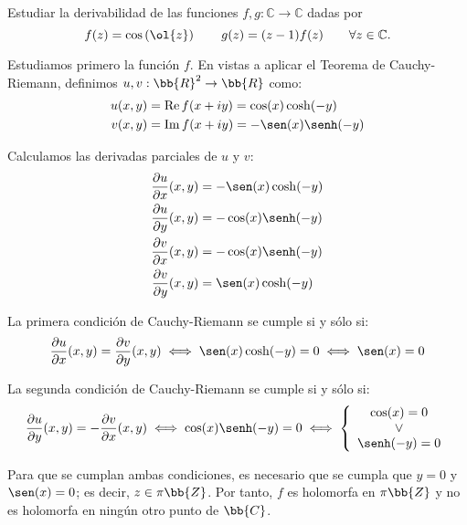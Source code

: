 \documentclass[12pt]{article}
\renewcommand{\Re}{\operatorname{Re}} %
\renewcommand{\Im}{\operatorname{Im}}
\begin{document}
    \begin{ejercicio}[3.5 puntos]
        Estudiar la derivabilidad de las funciones $f , g : \mathbb{C} \to \mathbb{C}$ dadas por
        \[
            f(z) = \cos\left(\ol{z}\right)\qquad g(z) = (z - 1) f(z)\qquad \forall z \in \mathbb{C}.
        \]

        Estudiamos primero la función $f$. En vistas a aplicar el Teorema de Cauchy-Riemann, definimos $u, v : \bb{R}^2 \to \bb{R}$ como:
        \begin{align*}
            u(x,y) &= \Re f(x+iy) = \cos(x)\cosh(-y) \\
            v(x,y) &= \Im f(x+iy) = -\sen(x)\senh(-y)
        \end{align*}

        Calculamos las derivadas parciales de $u$ y $v$:
        \begin{align*}
            \frac{\partial u}{\partial x}(x,y) &= -\sen(x)\cosh(-y) \\
            \frac{\partial u}{\partial y}(x,y) &= -\cos(x)\senh(-y) \\
            \frac{\partial v}{\partial x}(x,y) &= -\cos(x)\senh(-y) \\
            \frac{\partial v}{\partial y}(x,y) &= \sen(x)\cosh(-y)
        \end{align*}

        La primera condición de Cauchy-Riemann se cumple si y sólo si:
        \begin{align*}
            \frac{\partial u}{\partial x}(x,y) = \frac{\partial v}{\partial y}(x,y) \iff \sen(x)\cosh(-y) =  0 \iff \sen(x) = 0
        \end{align*}

        La segunda condición de Cauchy-Riemann se cumple si y sólo si:
        \begin{align*}
            \frac{\partial u}{\partial y}(x,y) = -\frac{\partial v}{\partial x}(x,y) \iff \cos(x)\senh(-y) = 0 \iff \left\{
            \begin{array}{c}
                \cos(x) = 0 \\
                \lor\\
                \senh(-y) = 0
            \end{array}
            \right.
        \end{align*}

        Para que se cumplan ambas condiciones, es necesario que se cumpla que $y=0$ y $\sen(x) = 0$; es decir, $z\in \pi\bb{Z}$. Por tanto, $f$ es holomorfa en $\pi\bb{Z}$ y no es holomorfa en ningún otro punto de $\bb{C}$.\\


\end{ejercicio}
\end{document}
